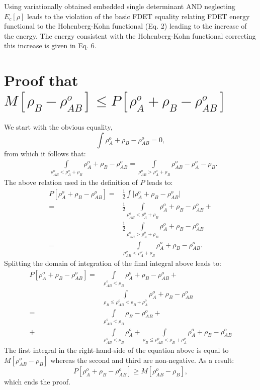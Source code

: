 \documentclass[amsmath,amssymb,preprint,aip,jcp]{revtex4-1}
\begin{document}
{Using variationally obtained embedded single determinant AND neglecting $E_c[\rho]$ leads to the violation of the basic FDET equality relating FDET energy functional to the Hohenberg-Kohn functional (Eq. 2) leading to the increase of the energy. The energy consistent with the Hohenberg-Kohn functional correcting this increase is given in Eq. 6.
}
\section{Proof that $M[\rho_{B} - \rho^{o}_{AB}] \leq P[\rho_A^o+\rho_B - \rho_{AB}^{o}] $}
We start with the obvious equality,
\begin{equation}
\int \rho^{o}_A + \rho_B - \rho_{AB}^o = 0, 
\end{equation}
from which it follows that:
\begin{align}
 & \int\limits_{\rho_{AB}^o < \rho^{o}_A + \rho_B}\rho^{o}_A + \rho_B - \rho_{AB}^o = \int\limits_{\rho_{AB}^o > \rho^{o}_A + \rho_B}\rho_{AB}^o - \rho^{o}_A - \rho_B.
\end{align}
The above relation used in the definition of $P$ leads to:
\begin{align}\label{eq:P_alternatives}
P[\rho^{o}_A + \rho_B - \rho_{AB}^o] = & \frac{1}{2}  \int \vert \rho^{o}_A + \rho_B - \rho_{AB}^o \vert \\ \nonumber
 = & \frac{1}{2}  \int\limits_{\rho_{AB}^o <\rho^{o}_A + \rho_B}\rho^{o}_A + \rho_B - \rho_{AB}^o + \\ \nonumber
 & \frac{1}{2}  \int\limits_{\rho_{AB}^o > \rho^{o}_A + \rho_B}\rho^{o}_A + \rho_B - \rho_{AB}^o \\ \nonumber
= & \int\limits_{\rho_{AB}^o <\rho^{o}_A + \rho_B}\rho^{o}_A + \rho_B - \rho_{AB}^o.
\end{align}
Splitting the domain of integration of the final integral above  leads to: 
\begin{align}
P[\rho^{o}_A + \rho_B - \rho_{AB}^o] = & \int\limits_{\rho_{AB}^o < \rho_B}\rho^{o}_A + \rho_B - \rho_{AB}^o + \\ \nonumber
 & \int\limits_{\rho_B \leq \rho_{AB}^o < \rho_B + \rho^{o}_A}\rho^{o}_A + \rho_B - \rho_{AB}^o\nonumber \\
 = & \int\limits_{\rho_{AB}^o < \rho_B} \rho_B - \rho_{AB}^o + \\ \nonumber
 +&\int\limits_{\rho_{AB}^o < \rho_B}\rho^{o}_A + \int\limits_{\rho_B \leq \rho_{AB}^o < \rho_B + \rho^{o}_A}\rho^{o}_A + \rho_B - \rho_{AB}^o\nonumber 
\end{align}
The first integral in the right-hand-side of the equation above is equal to $M[\rho_{AB}^o - \rho_B]$ whereas the second and third are non-negative. As a result:
\begin{equation}
 P[\rho^{o}_A + \rho_B - \rho_{AB}^o] \geq M[\rho_{AB}^o - \rho_B],
\end{equation}
which ends the proof.
\end{document}
